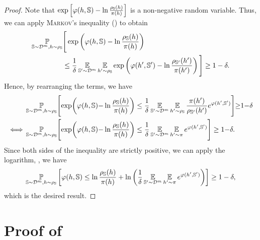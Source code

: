 \begin{noaddcontents}
\generaldisintegratedrivasplata*
\begin{proof}
Note that $\exp\left[\varphi(h,\mathbb{S})-\ln\frac{\rho_{\mathbb{S}}(h)}{\pi(h)}\right]$ is a non-negative random variable.
Thus, we can apply \textsc{Markov}'s inequality () to obtain 
\begin{align*}
    \operatorname*{\mathbb{P}}_{\mathbb{S}\sim\mathcal{D}^m, h\sim\rho_{\mathbb{S}}} &\Bigg[\exp\left(\varphi(h,\mathbb{S})-\ln\frac{\rho_{\mathbb{S}}(h)}{\pi(h)}\right)\\
    &\le \frac{1}{\delta}\operatorname*{\mathbb{E}}_{\mathbb{S}'\sim\mathcal{D}^m}\operatorname*{\mathbb{E}}_{h'\sim\rho_{\mathbb{S}}}\exp\left(\varphi(h',\mathbb{S}')-\ln\frac{\rho_{\mathbb{S}'}(h')}{\pi(h')}\right) \Bigg] \ge 1-\delta.
\end{align*}
Hence, by rearranging the terms, we have
\begin{align*}
    &\operatorname*{\mathbb{P}}_{\mathbb{S}\sim\mathcal{D}^m, h\sim\rho_{\mathbb{S}}} \!\Bigg[\!\exp\!\left(\varphi(h,\mathbb{S}){-}\ln\frac{\rho_{\mathbb{S}}(h)}{\pi(h)}\right) \le \frac{1}{\delta}\operatorname*{\mathbb{E}}_{\mathbb{S}'\sim\mathcal{D}^m}\operatorname*{\mathbb{E}}_{h'\sim\rho_{\mathbb{S}}}\frac{\pi(h')}{\rho_{\mathbb{S}'}(h')}e^{\varphi(h',\mathbb{S}')} \Bigg]{\ge}1{-}\delta\\
    \iff &\operatorname*{\mathbb{P}}_{\mathbb{S}\sim\mathcal{D}^m, h\sim\rho_{\mathbb{S}}} \!\Bigg[\!\exp\!\left(\varphi(h,\mathbb{S}){-}\ln\frac{\rho_{\mathbb{S}}(h)}{\pi(h)}\right) \le \frac{1}{\delta}\operatorname*{\mathbb{E}}_{\mathbb{S}'\sim\mathcal{D}^m}\operatorname*{\mathbb{E}}_{h'\sim\pi}e^{\varphi(h',\mathbb{S}')} \Bigg] \ge 1{-}\delta.
\end{align*}
Since both sides of the inequality are strictly positive, we can apply the logarithm, \ie, we have
\begin{align*}
    \operatorname*{\mathbb{P}}_{\mathbb{S}\sim\mathcal{D}^m, h\sim\rho_{\mathbb{S}}}\left[ \varphi(h,\mathbb{S})\le \ln\frac{\rho_{\mathbb{S}}(h)}{\pi(h)} +\ln\left(\frac{1}{\delta}\operatorname*{\mathbb{E}}_{\mathbb{S}'\sim\mathcal{D}^m}\operatorname*{\mathbb{E}}_{h'\sim\pi}e^{\varphi(h',\mathbb{S}')}\right) \right] \ge 1-\delta,
\end{align*}
which is the desired result.
\end{proof}

\section{Proof of }
\label{ap:pac-bayes:sec:proof-disintegrated-catoni}


\end{noaddcontents}
